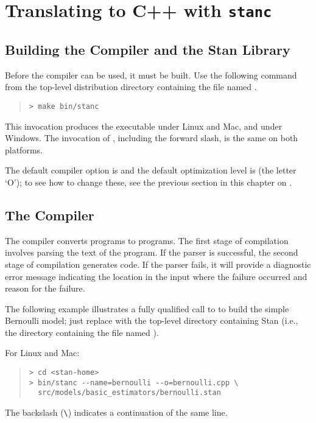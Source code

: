 \section{Translating \Stan to C++ with {\tt\bfseries stanc}}\label{stanc.section}


\subsection{Building the \stanc Compiler and the Stan Library}

Before the \stanc compiler can be used, it must be built.  Use the
following command from the top-level distribution directory containing
the file named .
%
\begin{quote}
\begin{Verbatim}[fontshape=sl,fontsize=\small]
> make bin/stanc
\end{Verbatim}
\end{quote}
%
This invocation produces the executable  under Linux
and Mac, and  under Windows.  The invocation of
, including the forward slash, is the same on both platforms.

The default compiler option is  and the default
optimization level is  (the letter `O');  to see how to
change these, see the previous section in this chapter on .


\subsection{The \stanc Compiler}

The \stanc compiler converts \Stan programs to \Cpp programs.  The
first stage of compilation involves parsing the text of the \Stan
program.  If the parser is successful, the second stage of compilation
generates \Cpp code.  If the parser fails, it will provide a
diagnostic error message indicating the location in the input where
the failure occurred and reason for the failure.

The following example illustrates a fully qualified call to \stanc
to build the simple Bernoulli model; just replace 
with the top-level directory containing Stan (i.e., the directory
containing the file named ). 

For Linux and Mac:
%
\begin{quote}
\begin{Verbatim}[fontshape=sl,fontsize=\small]
> cd <stan-home>
> bin/stanc --name=bernoulli --o=bernoulli.cpp \
  src/models/basic_estimators/bernoulli.stan 
\end{Verbatim}
\end{quote}
%
The backslash (\Verb|\|) indicates a continuation of the same line.

